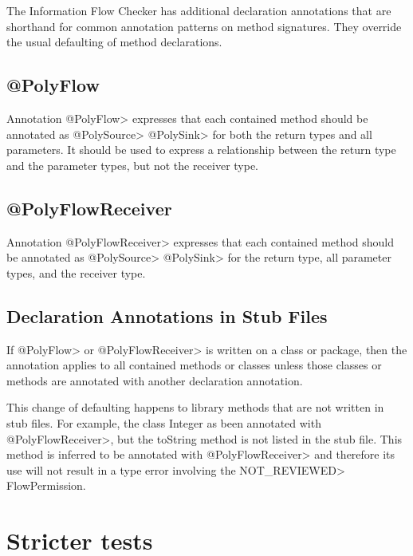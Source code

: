 The Information Flow Checker has additional declaration annotations that are shorthand for common 
annotation patterns on method signatures.   They override the usual defaulting of method declarations.

\subsection{@PolyFlow\label{sec:polyflow}}

Annotation \<@PolyFlow> expresses that each contained method should be annotated as \<@PolySource> 
\<@PolySink> for both the return types and all parameters. It should be used to express a relationship 
between the return type and the parameter types, but not the receiver type.


\subsection{@PolyFlowReceiver\label{sec:polyflowreceiver}}

Annotation \<@PolyFlowReceiver> expresses that each contained method should be annotated as \<@PolySource> \<@PolySink> for the return type, all parameter types, and the receiver type.

\subsection{Declaration Annotations in Stub Files\label{sec:declannosstubfiles}}
If \<@PolyFlow> or \<@PolyFlowReceiver> is written on a class or package, then the annotation applies
 to all contained methods or classes unless those classes or methods are annotated with another 
 declaration annotation.   

This change of defaulting happens to library methods that are not written in stub files.  For example, the class
 Integer as been annotated with  \<@PolyFlowReceiver>, but the toString method is not listed in the stub file.  
 This method is inferred to be annotated with  \<@PolyFlowReceiver> and therefore its use will not result in a 
 type error  involving the \<NOT\_REVIEWED> FlowPermission. 
 






\section{Stricter tests\label{sec:stricter}}

